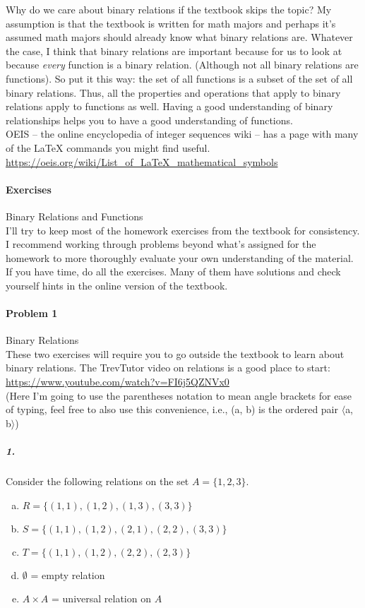 \documentclass[11pt]{article} %
\newcommand{\stuple}[1]{$\langle$#1$\rangle$} %
\begin{document}
	Why do we care about binary relations if the textbook skips the topic? My assumption is that the textbook is written for math majors and perhaps it's assumed math majors should already know what binary relations are. Whatever the case, I think that binary relations are important because for us to look at because \textit{every} function is a binary relation. (Although not all binary relations are functions). So put it this way: the set of all functions is a subset of the set of all binary relations. Thus, all the properties and operations that apply to binary relations apply to functions as well. Having a good understanding of binary relationships helps you to have a good understanding of functions.\\
	
	
	OEIS -- the online encyclopedia of integer sequences wiki -- has a page with many of the \LaTeX{} commands you might find useful. \url{https://oeis.org/wiki/List_of_LaTeX_mathematical_symbols}
	
	
	\paragraph{Exercises} Binary Relations and Functions\\
	
	I'll try to keep most of the homework exercises from the textbook for consistency. I recommend working through problems beyond what's assigned for the homework to more thoroughly evaluate your own understanding of the material. If you have time, do all the exercises. Many of them have solutions and check yourself hints in the online version of the textbook.
	
	\newpage
	\paragraph{Problem 1} Binary Relations\\
	
	These two exercises will require you to go outside the textbook to learn about binary relations. The TrevTutor video on relations is a good place to start: \url{https://www.youtube.com/watch?v=FI6j5QZNVx0}\\
	
	(Here I'm going to use the parentheses notation to mean angle brackets for ease of typing, feel free to also use this convenience, i.e., (a, b) is the ordered pair \stuple{a, b})
	
		\subparagraph{1.} Consider the following relations on the set $A = \{1, 2, 3\}$.
		\begin{enumerate}[a)]
			\item $R = \{(1, 1), (1, 2), (1, 3), (3, 3)\}$
			\item $S = \{(1, 1), (1, 2), (2, 1), (2, 2), (3, 3)\}$
			\item $T = \{(1, 1), (1, 2), (2, 2), (2, 3)\}$
			\item $\emptyset$ = empty relation
			\item $A \times A$ = universal relation on $A$
		\end{enumerate}
	
\end{document}
